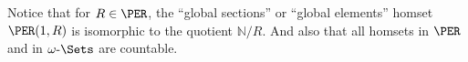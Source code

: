 \begin{exercise}
Notice that for \(R \in \PER\), the ``global sections'' or ``global elements'' homset \(\PER(1, R)\) is isomorphic to the quotient \(\mathbb{N} / R\).
And also that all homsets in \(\PER\) and in \(\omega\text{-}\Sets\) are countable.
\end{exercise}